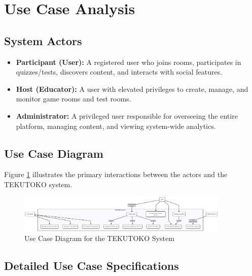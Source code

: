 \section{Use Case Analysis}
\label{sec:use-case}

\subsection{System Actors}
\begin{itemize}
    \item \textbf{Participant (User):} A registered user who joins rooms, participates in quizzes/tests, discovers content, and interacts with social features.
    \item \textbf{Host (Educator):} A user with elevated privileges to create, manage, and monitor game rooms and test rooms.
    \item \textbf{Administrator:} A privileged user responsible for overseeing the entire platform, managing content, and viewing system-wide analytics.
\end{itemize}

\subsection{Use Case Diagram}
Figure \ref{fig:use-case-diagram} illustrates the primary interactions between the actors and the TEKUTOKO system.

\begin{figure}[htbp]
\centering
\includegraphics[width=0.9\textwidth]{figures/use-case-diagram.png}
\caption{Use Case Diagram for the TEKUTOKO System}
\label{fig:use-case-diagram}
\end{figure}

\clearpage %

\subsection{Detailed Use Case Specifications}

